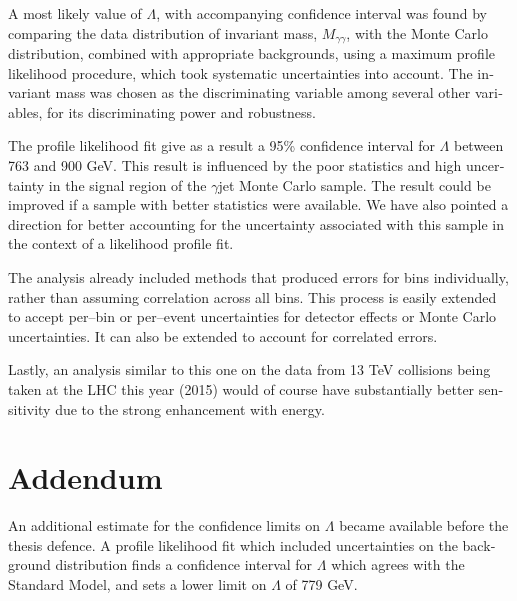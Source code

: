 \begin{english}
A most likely value of $\Lambda$, with accompanying confidence interval was found by comparing the data distribution of invariant mass, $M_{\gamma\gamma}$, with the Monte Carlo distribution, combined with appropriate backgrounds, using a maximum profile likelihood procedure, which took systematic uncertainties into account. The invariant mass was chosen as the discriminating variable among several other variables, for its discriminating power and robustness.

The profile likelihood fit give as a result a 95\% confidence interval for $\Lambda$ between 763 and 900 GeV. This result is influenced by the poor statistics and high uncertainty in the signal region of the \atlas{} $\gamma$jet Monte Carlo sample. The result could be improved if a sample with better statistics were available. We have also pointed a direction for better accounting for the uncertainty associated with this sample in the context of a likelihood profile fit.

The analysis already included methods that produced errors for bins individually, rather than assuming correlation across all bins. This process is easily extended to accept per--bin or per--event uncertainties for detector effects or Monte Carlo uncertainties. It can also be extended to account for correlated errors.

Lastly, an analysis similar to this one on the data from 13 TeV collisions being taken at the LHC this year (2015) would of course have substantially better sensitivity due to the strong enhancement with energy.

\section{Addendum}
An additional estimate for the confidence limits on $\Lambda$ became available before the thesis defence. A profile likelihood fit which included uncertainties on the background distribution finds a confidence interval for $\Lambda$ which agrees with the Standard Model, and sets a lower limit on $\Lambda$ of 779 GeV.

\printbibliography[title=References]



\end{english}

